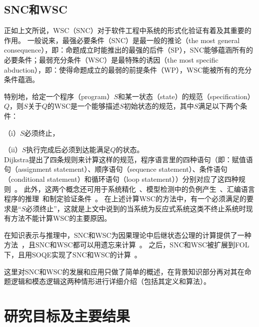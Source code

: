 \subsection{SNC和WSC}


正如上文所说，WSC（SNC）对于软件工程中系统的形式化验证有着及其重要的作用。
一般说来，最强必要条件（SNC）是最一般的推论（the most general consequence），即：命题成立时能推出的最强的后件（SP），SNC能够蕴涵所有的必要条件；最弱充分条件（WSC）是最特殊的诱因（the most specific abduction），即：使得命题成立的最弱的前提条件（WP），WSC能被所有的充分条件蕴涵。

特别地，给定一个程序（program）$S$和某一状态（state）的规范（specification）$Q$，则$S$关于$Q$的WSC是一个能够描述$S$初始状态的规范，其中$S$满足以下两个条件：

（i）$S$必须终止，

（ii）$S$执行完成后必须到达能满足$Q$的状态。\\
Dijkstra提出了四条规则来计算这样的规范，程序语言里的四种语句（即：赋值语句（assignment statement）、顺序语句（sequence statement）、条件语句（conditional statement）和循环语句（loop statement））分别对应了这四种规则~\cite{DBLP:journals/cacm/Dijkstra75}。
此外，这两个概念还可用于系统精化~\cite{woodcock1990refinement}、模型检测中的负例产生~\cite{dailler2018instrumenting}、汇编语言程序的推理~\cite{legato2002weakest}和制定验证条件~\cite{DBLP:journals/ipl/Leino05}。
在上述计算WSC的方法中，有一个必须满足的要求是“$S$必须终止”，这就是上文中说到的当系统为反应式系统这类不终止系统时现有方法不能计算WSC的主要原因。


在知识表示与推理中，SNC和WSC为因果理论中后继状态公理的计算提供了一种方法~\cite{DBLP:journals/jair/Lin03}，且SNC和WSC都可以用遗忘来计算~\cite{DBLP:journals/ai/Lin01,DBLP:conf/ijcai/DohertyLS01}。
之后，SNC和WSC被扩展到FOL下，且用SOQE实现了SNC和WSC的计算~\cite{DBLP:conf/ijcai/DohertyLS01}。

这里对SNC和WSC的发展和应用只做了简单的概述，在背景知识部分再对其在命题逻辑和模态逻辑这两种情形进行详细介绍（包括其定义和算法）。






\section{研究目标及主要结果}

